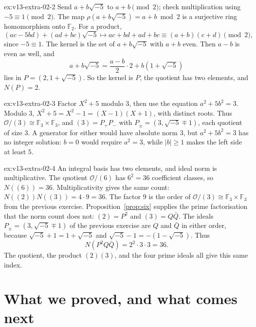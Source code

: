 \begin{solution}{ex:v13-extra-02-2}
\idea Send $a+b\sqrt{-5}$ to $a+b\pmod2$; check multiplication using $-5\equiv1\pmod2$.
\writeup The map $\rho(a+b\sqrt{-5})=a+b\bmod2$ is a surjective ring homomorphism onto $\mathbb F_2$. For a product,
\[
(ac-5bd)+(ad+bc)\sqrt{-5}\longmapsto ac+bd+ad+bc\equiv(a+b)(c+d)\pmod2,
\]
since $-5\equiv1$. The kernel is the set of $a+b\sqrt{-5}$ with $a+b$ even. Then $a-b$ is even as well, and
\[
a+b\sqrt{-5}=\frac{a-b}2\cdot2+b(1+\sqrt{-5})
\]
lies in $P=(2,1+\sqrt{-5})$. So the kernel is $P$, the quotient has two elements, and $N(P)=2$.
\end{solution}

\begin{solution}{ex:v13-extra-02-3}
\idea Factor $X^2+5$ modulo $3$, then use the equation $a^2+5b^2=3$.
\writeup Modulo $3$, $X^2+5=X^2-1=(X-1)(X+1)$, with distinct roots. Thus $\mathcal O/(3)\cong\mathbb F_3\times\mathbb F_3$, and $(3)=P_+P_-$ with $P_\pm=(3,\sqrt{-5}\mp1)$, each quotient of size $3$. A generator for either would have absolute norm $3$, but $a^2+5b^2=3$ has no integer solution: $b=0$ would require $a^2=3$, while $|b|\ge1$ makes the left side at least $5$.
\end{solution}

\begin{solution}{ex:v13-extra-02-4}
\idea An integral basis has two elements, and ideal norm is multiplicative.
\writeup The quotient $\mathcal O/(6)$ has $6^2=36$ coefficient classes, so $N((6))=36$. Multiplicativity gives the same count: $N((2))N((3))=4\cdot9=36$. The factor $9$ is the order of $\mathcal O/(3)\cong\mathbb F_3\times\mathbb F_3$ from the previous exercise. Proposition~\ref{prop:six} supplies the prime factorisation that the norm count does not: $(2)=P^2$ and $(3)=Q\bar Q$. The ideals $P_\pm=(3,\sqrt{-5}\mp1)$ of the previous exercise are $Q$ and $\bar Q$ in either order, because $\sqrt{-5}+1=1+\sqrt{-5}$ and $\sqrt{-5}-1=-(1-\sqrt{-5})$. Thus
\[
N(P^2Q\bar Q)=2^2\cdot3\cdot3=36.
\]
The quotient, the product $(2)(3)$, and the four prime ideals all give this same index.
\end{solution}

\section{What we proved, and what comes next}

